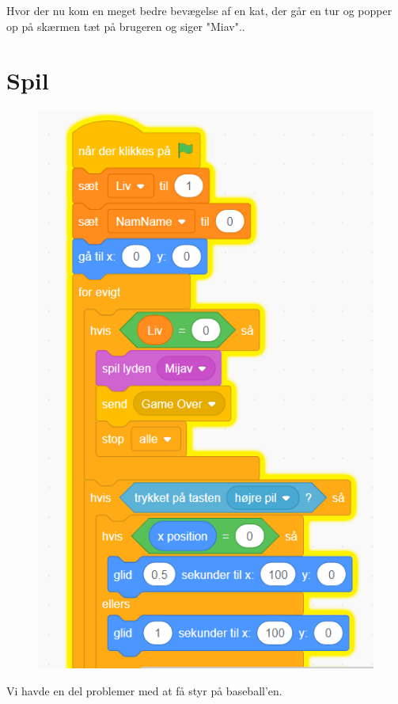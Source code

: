 \documentclass{article}
\begin{document}
Hvor der nu kom en meget bedre bevægelse af en kat, der går en tur og popper op på skærmen tæt på brugeren og siger "Miav"..

\section{Spil}
\begin{figure}[h]
	\includegraphics[scale=0.2]{3billede.png}
\end{figure}

Vi havde en del problemer med at få styr på baseball'en. 
\end{document}
